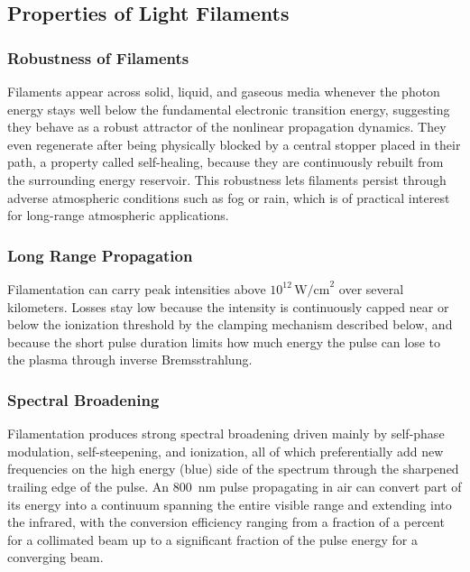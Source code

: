 \documentclass[11pt,a4paper]{article}
\begin{document}
\subsection{Properties of Light Filaments}

\subsubsection{Robustness of Filaments}
Filaments appear across solid, liquid, and gaseous media whenever the photon energy stays well below the fundamental electronic transition energy, suggesting they behave as a robust attractor of the nonlinear propagation dynamics. They even regenerate after being physically blocked by a central stopper placed in their path, a property called self-healing, because they are continuously rebuilt from the surrounding energy reservoir. This robustness lets filaments persist through adverse atmospheric conditions such as fog or rain, which is of practical interest for long-range atmospheric applications.

\subsubsection{Long Range Propagation}
Filamentation can carry peak intensities above $10^{12}\,\text{W/cm}^2$ over several kilometers. Losses stay low because the intensity is continuously capped near or below the ionization threshold by the clamping mechanism described below, and because the short pulse duration limits how much energy the pulse can lose to the plasma through inverse Bremsstrahlung.

\subsubsection{Spectral Broadening}
Filamentation produces strong spectral broadening driven mainly by self-phase modulation, self-steepening, and ionization, all of which preferentially add new frequencies on the high energy (blue) side of the spectrum through the sharpened trailing edge of the pulse. An 800~nm pulse propagating in air can convert part of its energy into a continuum spanning the entire visible range and extending into the infrared, with the conversion efficiency ranging from a fraction of a percent for a collimated beam up to a significant fraction of the pulse energy for a converging beam.
\end{document}
